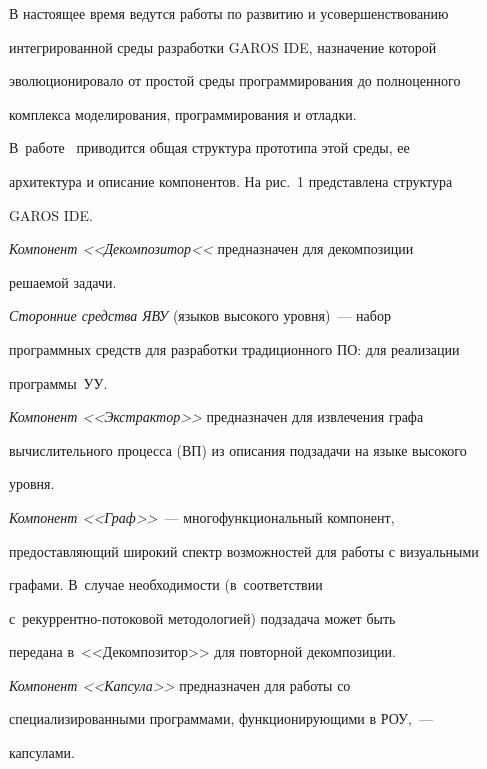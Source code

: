   

  В настоящее время ведутся работы по развитию и усовершенствованию 

интегрированной среды разработки GAROS IDE, назначение которой 

эволюционировало от простой среды программирования до полноценного 

комплекса моделирования, программирования и отладки.  

В~работе~\cite{5-step} приводится общая структура прототипа этой среды, ее 

архитектура и описание компонентов. На рис.~1 представлена структура 

GAROS IDE.

  

  \textit{Компонент <<Декомпозитор<<} предназначен для декомпозиции 

решаемой задачи.

  

  \textit{Сторонние средства ЯВУ} (языков высокого уровня)~--- набор 

программных средств для разработки традиционного ПО: для реализации 

программы~УУ.

      



       

  \textit{Компонент <<Экстрактор>>} предназначен для извлечения графа 

вычислительного процесса (ВП) из описания подзадачи на языке высокого 

уровня. 

  

  \textit{Компонент <<Граф>>}~--- многофункциональный компонент, 

предоставляющий широкий спектр возможностей для работы с визуальными 

графами. В~случае необходимости (в~соответствии  

с~ре\-кур\-рен\-т\-но-по\-то\-ко\-вой методологией) подзадача может быть 

передана в~<<Декомпозитор>> для повторной декомпозиции. 

  

  \textit{Компонент <<Капсула>>} предназначен для работы со 

специализированными программами, функционирующими в РОУ,~--- 

капсулами. 

  

